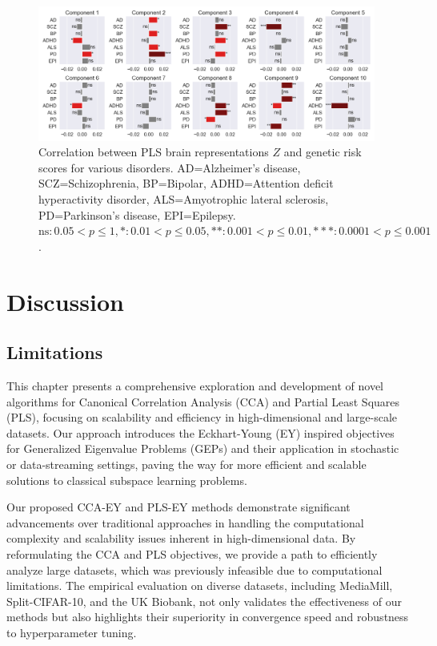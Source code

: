 \begin{figure}
    \centering
    \includegraphics[width=0.99\textwidth,trim={0.5cm 0cm 0.7cm 0cm}]{figures/UKBB/prs_correlations.png}
    \caption{Correlation between PLS brain representations \( Z \) and genetic risk scores for various disorders. AD=Alzheimer's disease, SCZ=Schizophrenia, BP=Bipolar, ADHD=Attention deficit hyperactivity disorder, ALS=Amyotrophic lateral sclerosis, PD=Parkinson's disease, EPI=Epilepsy. $\text{ns}: 0.05< p \leq 1, \ast: 0.01< p \leq 0.05, \ast\ast: 0.001< p \leq 0.01, \ast\ast\ast: 0.0001< p \leq 0.001$.}
    \label{fig:genetic_risk}
\end{figure}

\section{Discussion}

\subsection{Limitations}

This chapter presents a comprehensive exploration and development of novel algorithms for Canonical Correlation Analysis (CCA) and Partial Least Squares (PLS), focusing on scalability and efficiency in high-dimensional and large-scale datasets.
Our approach introduces the Eckhart-Young (EY) inspired objectives for Generalized Eigenvalue Problems (GEPs) and their application in stochastic or data-streaming settings, paving the way for more efficient and scalable solutions to classical subspace learning problems.

Our proposed CCA-EY and PLS-EY methods demonstrate significant advancements over traditional approaches in handling the computational complexity and scalability issues inherent in high-dimensional data.
By reformulating the CCA and PLS objectives, we provide a path to efficiently analyze large datasets, which was previously infeasible due to computational limitations.
The empirical evaluation on diverse datasets, including MediaMill, Split-CIFAR-10, and the UK Biobank, not only validates the effectiveness of our methods but also highlights their superiority in convergence speed and robustness to hyperparameter tuning.

